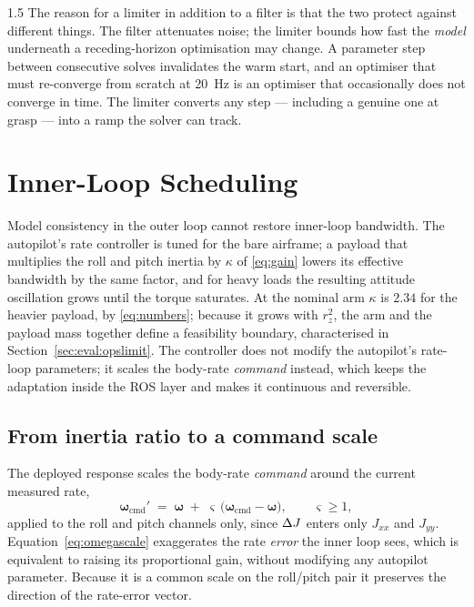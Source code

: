 \begin{spacing}{1.5}
The reason for a limiter in addition to a filter is that the two protect against
different things. The filter attenuates noise; the limiter bounds how fast the
\emph{model} underneath a receding-horizon optimisation may change. A parameter
step between consecutive solves invalidates the warm start, and an optimiser that
must re-converge from scratch at \SI{20}{\hertz} is an optimiser that
occasionally does not converge in time. The limiter converts any step ---
including a genuine one at grasp --- into a ramp the solver can track.

\section{Inner-Loop Scheduling}\label{sec:frame:omegascale}\label{sec:model:gain}

Model consistency in the outer loop cannot restore inner-loop bandwidth. The
autopilot's rate controller is tuned for the bare airframe; a payload that
multiplies the roll and pitch inertia by $\kappa$ of \eqref{eq:gain} lowers its
effective bandwidth by the same factor, and for heavy loads the resulting
attitude oscillation grows until the torque saturates. At the nominal arm
$\kappa$ is $2.34$ for the heavier payload, by \eqref{eq:numbers}; because it grows
with $r_z^2$, the arm and the payload mass together define a feasibility
boundary, characterised in Section~\ref{sec:eval:opslimit}. The controller does
not modify the autopilot's rate-loop parameters; it scales the body-rate
\emph{command} instead, which keeps the adaptation inside the ROS layer and makes
it continuous and reversible.

\subsection{From inertia ratio to a command scale}\label{sec:frame:scale}

The deployed response scales the body-rate
\emph{command} around the current measured rate,
\begin{equation}
\bm\omega_{\mathrm{cmd}}' \;=\; \bm\omega \;+\; \varsigma\,\bigl(\bm\omega_{\mathrm{cmd}} - \bm\omega\bigr),
\qquad \varsigma \ge 1,
\label{eq:omegascale}
\end{equation}
applied to the roll and pitch channels only, since $\Delta J$ enters only $J_{xx}$ and
$J_{yy}$. Equation~\eqref{eq:omegascale} exaggerates the rate \emph{error} the
inner loop sees, which is equivalent to raising its proportional gain, without
modifying any autopilot parameter. Because it is a common scale on the roll/pitch
pair it preserves the direction of the rate-error vector.


\end{spacing}
